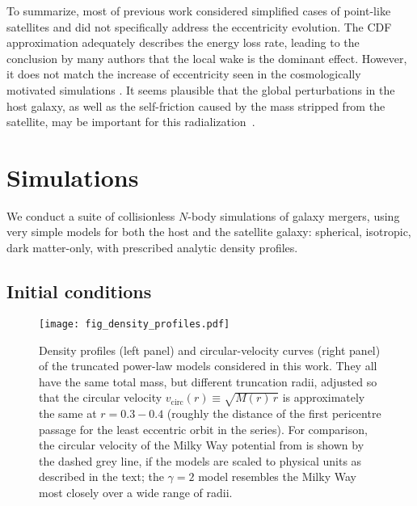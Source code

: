 \documentclass[twocolumn]{aastex63}
\begin{document}
To summarize, most of previous work considered simplified cases of point-like satellites and did not specifically address the eccentricity evolution. The CDF approximation adequately describes the energy loss rate, leading to the conclusion by many authors that the local wake is the dominant effect. However, it does not match the increase of eccentricity seen in the cosmologically motivated simulations \citep[e.g.,][]{Amorisco2017}. It seems plausible that the global perturbations in the host galaxy, as well as the self-friction caused by the mass stripped from the satellite, may be important for this radialization~\citep[cf][]{Barnes1988,Barnes1992,Amorisco2017}.


\section{Simulations}   \label{sec:simulations}

We conduct a suite of collisionless $N$-body simulations of galaxy mergers, using very simple models for both the host and the satellite galaxy: spherical, isotropic, dark matter-only, with prescribed analytic density profiles.

\subsection{Initial conditions}   \label{sec:initial_conditions}

\begin{figure}
\texttt{[image: fig\_density\_profiles.pdf]}
\caption{Density profiles (left panel) and circular-velocity curves (right panel) of the truncated power-law models considered in this work. They all have the same total mass, but different truncation radii, adjusted so that the circular velocity $v_\mathrm{circ}(r)\equiv \sqrt{M(r)\,r}$ is approximately the same at $r=0.3-0.4$ (roughly the distance of the first pericentre passage for the least eccentric orbit in the series). For comparison, the circular velocity of the Milky Way potential from \citet{McMillan2017} is shown by the dashed grey line, if the models are scaled to physical units as described in the text; the $\gamma=2$ model resembles the Milky Way most closely over a wide range of radii.
}  \label{fig:density_profiles}
\end{figure}
\end{document}
